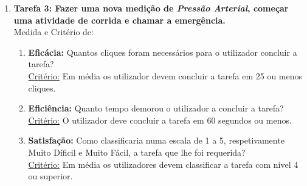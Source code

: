 \documentclass[12pt]{article}
\begin{document}
\begin{enumerate}
        \item \textbf{Tarefa 3: Fazer uma nova medição de \emph{Pressão Arterial}, começar uma atividade de corrida e chamar a emergência.} \\
        Medida e Critério de:
        \begin{enumerate}
            \item \textbf{Eficácia:} Quantos cliques foram necessários para o utilizador concluir a tarefa?\\
            \underline{Critério:} Em média os utilizador devem concluir a tarefa em 25 ou menos cliques.
            
            \item \textbf{Eficiência:} Quanto tempo demorou o utilizador a concluir a tarefa?\\
            \underline{Critério:} O utilizador deve concluir a tarefa em 60 segundos ou menos.
            
            \item \textbf{Satisfação:} Como classificaria numa escala de 1 a 5, respetivamente Muito Díficil e Muito Fácil, a tarefa que lhe foi requerida?\\
            \underline{Critério:} Em média os utilizadores devem classificar a tarefa com nível 4 ou superior.
        \end{enumerate}
    \end{enumerate}
\end{document}
